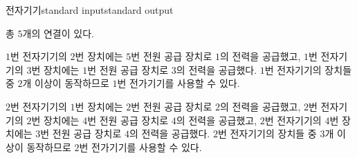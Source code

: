 \begin{problem}{전자기기}{standard input}{standard output}
\Example

\begin{example}
%
\end{example}

\Notes

총 $5$개의 연결이 있다.

$1$번 전자기기의 $2$번 장치에는 $5$번 전원 공급 장치로 $1$의 전력을 공급했고, $1$번 전자기기의 $3$번 장치에는 $1$번 전원 공급 장치로 $3$의 전력을 공급했다. $1$번 전자기기의 장치들 중 $2$개 이상이 동작하므로 $1$번 전가기기를 사용할 수 있다.

$2$번 전자기기의 $1$번 장치에는 $2$번 전원 공급 장치로 $2$의 전력을 공급했고, $2$번 전자기기의 $2$번 장치에는 $4$번 전원 공급 장치로 $4$의 전력을 공급했고, $2$번 전자기기의 $4$번 장치에는 $3$번 전원 공급 장치로 $4$의 전력을 공급했다. $2$번 전자기기의 장치들 중 $3$개 이상이 동작하므로 $2$번 전가기기를 사용할 수 있다.

\end{problem}

